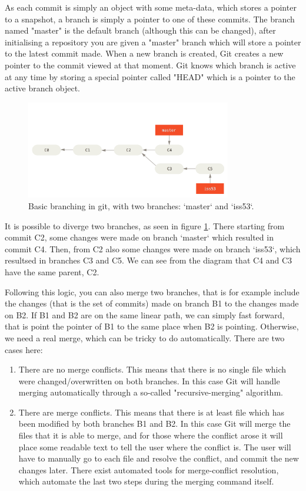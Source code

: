 \documentclass[12pt,twoside,notitlepage]{report}
\begin{document}
As each commit is simply an object with some meta-data, which stores a pointer to a snapshot, a branch is simply a pointer to one of these commits. The branch named "master" is the default branch (although this can be changed), after initialising a repository you are given a "master" branch which will store a pointer to the latest commit made. When a new branch is created, Git creates a new pointer to the commit viewed at that moment. Git knows which branch is active at any time by storing a special pointer called "HEAD" which is a pointer to the active branch object.
\begin{figure}[ht!]
\includegraphics[width=0.8\textwidth]{basic-branching_git.png}
\centering

\captionsetup{width=0.8\textwidth}
\caption[Basic branching in Git]{Basic branching in git, with two branches: `master` and `iss53`.}
\label{basic-branching_git}
\end{figure}

It is possible to diverge two branches, as seen in figure \ref{basic-branching_git}. There starting from commit C2, some changes were made on branch `master` which resulted in commit C4. Then, from C2 also some changes were made on branch `iss53`, which resultsed in branches C3 and C5. We can see from the diagram that C4 and C3 have the same parent, C2.

Following this logic, you can also merge two branches, that is for example include the changes (that is the set of commits) made on branch B1 to the changes made on B2. If B1 and B2 are on the same linear path, we can simply fast forward, that is point the pointer of B1 to the same place when B2 is pointing. Otherwise, we need a real merge, which can be tricky to do automatically. There are two cases here:
\begin{enumerate}
\item There are no merge conflicts. This means that there is no single file which were changed/overwritten on both branches. In this case Git will handle merging automatically through a so-called "recursive-merging" algorithm.
\item There are merge conflicts. This means that there is at least file which has been modified by both branches B1 and B2. In this case Git will merge the files that it is able to merge, and for those where the conflict arose it will place some readable text to tell the user where the conflict is. The user will have to manually go to each file and resolve the conflict, and commit the new changes later. There exist automated tools for merge-conflict resolution, which automate the last two steps during the merging command itself.
\end{enumerate}
\end{document}
